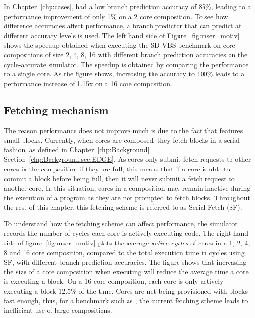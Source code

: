 In Chapter~\ref{chp:cases},  had a low branch prediction accuracy of 85\%, leading to a performance improvement of only 1\% on a 2 core composition.
To see how difference accuracies affect performance, a branch predictor that can predict at different accuracy levels is used.
The left hand side of Figure~\ref{fig:mser_motiv} shows the speedup obtained when executing the SD-VBS benchmark  on core compositions of size 2, 4, 8, 16 with different branch prediction accuracies on the cycle-accurate simulator.
The speedup is obtained by comparing the performance to a single core.
As the figure shows, increasing the accuracy to 100\% leads to a performance increase of 1.15x on a 16 core composition.


\subsection{Fetching mechanism}
The reason performance does not improve much is due to the fact that  features small blocks.
Currently, when cores are composed, they fetch blocks in a serial fashion, as defined in Chapter~\ref{chp:Background} Section~\ref{chp:Background:sec:EDGE}.
As cores only submit fetch requests to other cores in the composition if they are full, this means that if a core is able to commit a block before being full, then it will never submit a fetch request to another core.
In this situation, cores in a composition may remain inactive during the execution of a program as they are not prompted to fetch blocks.
Throughout the rest of this chapter, this fetching scheme is referred to as Serial Fetch (SF).%

To understand how the fetching scheme can affect performance, the simulator records the number of cycles each core is actively executing code.
The right hand side of figure~\ref{fig:mser_motiv} plots the average \textit{active cycles} of cores in a 1, 2, 4, 8 and 16 core composition, compared to the total execution time in cycles using SF, with different branch prediction accuracies.
The figure shows that increasing the size of a core composition when executing  will reduce the average time a core is executing a block.
On a 16 core composition, each core is only actively executing a block 12.5\% of the time.
Cores are not being provisioned with blocks fast enough, thus, for a benchmark such as , the current fetching scheme leads to inefficient use of large compositions.

